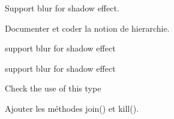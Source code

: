 \begin{DoxyRefList}
Support blur for shadow effect.  
\item[\label{todo__todo000002}%
\Hypertarget{todo__todo000002}%
Class \hyperlink{classlogs_1_1LoggerFactory}{logs\+:\+:Logger\+Factory} ]Documenter et coder la notion de hierarchie.  
\item[\label{todo__todo000006}%
\Hypertarget{todo__todo000006}%
Member \hyperlink{classui_1_1Text_a88d16f381c90e53c2346763e4fc810c8}{ui\+:\+:Text\+:\+:enable\+Shadow} (const \hyperlink{structColor4B}{Color4B} \&shadow\+Color=Color4\+B\+::\+B\+L\+A\+CK, const \hyperlink{classSize}{Size} \&offset=\hyperlink{classSize}{Size}(2,-\/2), int blur\+Radius=0)]support blur for shadow effect

support blur for shadow effect 
\item[\label{todo__todo000001}%
\Hypertarget{todo__todo000001}%
Member \hyperlink{classutils_1_1PointerList_a8d7b485e236a01cc14b41694ae0b3456}{utils\+:\+:Pointer\+List$<$ \+\_\+\+Tp, \+\_\+\+Alloc $>$\+:\+:size\+\_\+type} ]Check the use of this type  
\item[\label{todo__todo000004}%
\Hypertarget{todo__todo000004}%
Class \hyperlink{classutils_1_1Thread}{utils\+:\+:Thread} ]Ajouter les méthodes join() et kill(). 
\end{DoxyRefList}